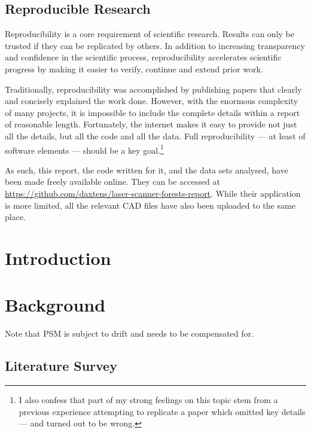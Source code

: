 \documentclass[12pt,oneside,a4paper]{book}
\begin{document}
\section{Reproducible Research}
\label{sec:repr-rese}

Reproducibility is a core requirement of scientific research. Results
can only be trusted if they can be replicated by others. In addition
to increasing transparency and confidence in the scientific process,
reproducibility accelerates scientific progress by making it easier to
verify, continue and extend prior work.

Traditionally, reproducibility was accomplished by publishing papers
that clearly and concisely explained the work done. However, with the
enormous complexity of many projects, it is impossible to include the
complete details within a report of reasonable length. Fortunately,
the internet makes it easy to provide not just all the details, but
all the code and all the data. Full reproducibility --- at least of
software elements --- should be a key goal.\footnote{I also
  confess that part of my strong feelings on this topic stem from a
  previous experience attempting to replicate a paper which omitted
  key details --- and turned out to be wrong. }

As such, this report, the code written for it, and the data sets
analysed, have been made freely available online. They can be accessed
at \url{https://github.com/daxtens/laser-scanner-forests-report}.
While their application is more limited, all the relevant CAD files
have also been uploaded to the same place.



\chapter{Introduction}
\label{cha:intro}

\chapter{Background}
\label{cha:background}

Note  that PSM is subject to
drift and needs to be compensated for.

\section{Literature Survey}
\label{sec:litsurvey}
\end{document}

